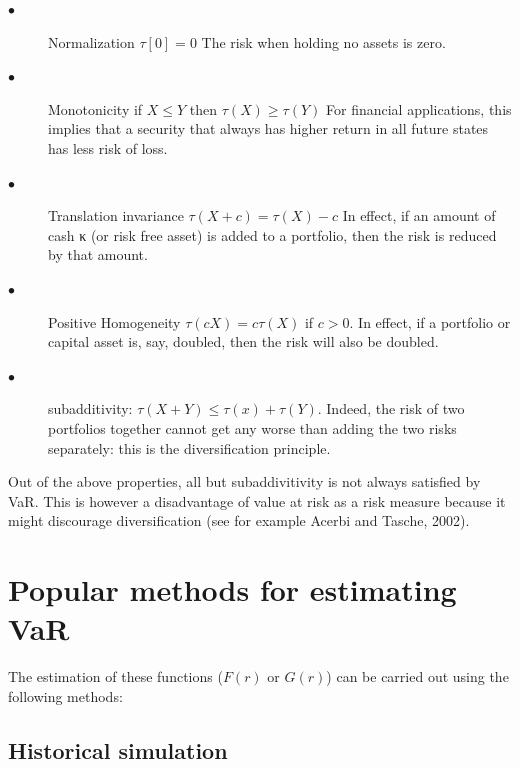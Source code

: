 \documentclass[a4paper,11pt,oneside]{book}
\begin{document}
\begin{description}
	\item[$\bullet$] Normalization \newline $\tau[0] = 0$ \newline The risk when holding no assets is zero.
	\item[$\bullet$] Monotonicity \newline if $X \leq Y$ then $\tau(X) \geq \tau(Y)$ \newline For financial applications, this implies that a
	security that always has higher return in all future states has less risk of loss.
	
	\item[$\bullet$] Translation invariance
	\newline  $\tau(X+c) = \tau(X)-c$ \newline In effect, if an amount of cash κ (or risk free asset)
	is added to a portfolio, then the risk is reduced by that amount.
	\item[$\bullet$] Positive Homogeneity
	\newline $\tau(cX) = c\tau(X)$ if $c>0$. \newline In effect, if a portfolio or capital asset is, say,
	doubled, then the risk will also be doubled.
	
		\item[$\bullet$] subadditivity: 
	\newline $\tau(X+Y)\leq \tau(x)+\tau(Y)$. 
	Indeed, the risk of two portfolios together cannot get any worse than adding the two risks separately: this is the diversification principle.
	
\end{description}
Out of the above properties, all but subaddivitivity is not always satisfied by VaR. This is however a disadvantage of value at risk as a risk measure because it might discourage diversification (see for example Acerbi and Tasche, 2002).

\section{Popular methods for estimating VaR}
The estimation of these functions ($F(r)$ or $G(r)$) can be carried out using the
following methods:

\subsection{Historical simulation}
\end{document}
